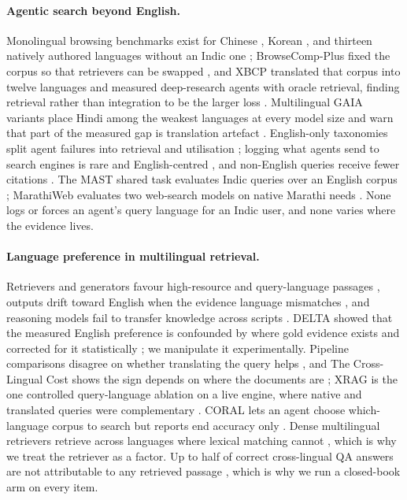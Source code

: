 \paragraph{Agentic search beyond English.} Monolingual browsing benchmarks exist for Chinese \citep{a2504_19314}, Korean \citep{a2606_02404,a2606_27595}, and thirteen natively authored languages without an Indic one \citep{a2610_03574}; BrowseComp-Plus fixed the corpus so that retrievers can be swapped \citep{a2508_06600}, and XBCP translated that corpus into twelve languages and measured deep-research agents with oracle retrieval, finding retrieval rather than integration to be the larger loss \citep{a2606_15345}. Multilingual GAIA variants place Hindi among the weakest languages at every model size \citep{a2505_15935,a2608_08775} and warn that part of the measured gap is translation artefact \citep{a2604_24929}. English-only taxonomies split agent failures into retrieval and utilisation \citep{a2608_01913,a2608_05212,a2609_08094}; logging what agents send to search engines is rare and English-centred \citep{a2609_19244}, and non-English queries receive fewer citations \citep{a2609_00319}. The MAST shared task evaluates Indic queries over an English corpus \citep{mast2026}; MarathiWeb evaluates two web-search models on native Marathi needs \citep{kale2026marathiweb}. None logs or forces an agent's query language for an Indic user, and none varies where the evidence lives.

\paragraph{Language preference in multilingual retrieval.} Retrievers and generators favour high-resource and query-language passages \citep{a2502_11175,a2604_20199,a2605_07249,a2509_13930}, outputs drift toward English when the evidence language mismatches \citep{a2511_09984}, and reasoning models fail to transfer knowledge across scripts \citep{a2603_17070}. DELTA showed that the measured English preference is confounded by where gold evidence exists and corrected for it statistically \citep{a2601_02956}; we manipulate it experimentally. Pipeline comparisons disagree on whether translating the query helps \citep{a2504_03616,a2510_23070,a2507_22923}, and The Cross-Lingual Cost shows the sign depends on where the documents are \citep{a2507_07543}; XRAG is the one controlled query-language ablation on a live engine, where native and translated queries were complementary \citep{a2505_10089}. CORAL lets an agent choose which-language corpus to search but reports end accuracy only \citep{a2604_25676}. Dense multilingual retrievers retrieve across languages where lexical matching cannot \citep{a2511_19324,a2402_03216}, which is why we treat the retriever as a factor. Up to half of correct cross-lingual QA answers are not attributable to any retrieved passage \citep{a2305_14332}, which is why we run a closed-book arm on every item.

